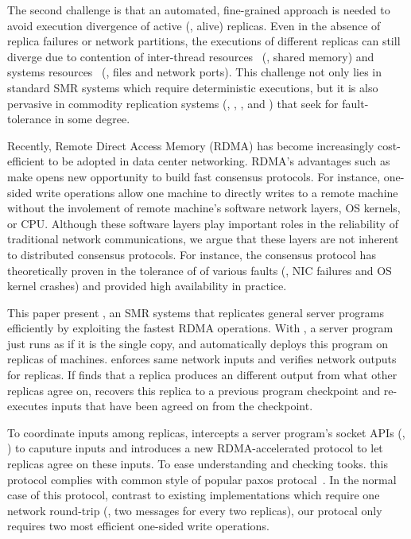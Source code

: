 The second challenge is that an automated, fine-grained approach is needed to 
avoid execution divergence of active (\ie, alive) replicas. Even in the absence 
of replica failures or network partitions, the executions of different replicas 
can still diverge due to contention of 
inter-thread resources~\cite{coredet:asplos10} (\eg, shared memory) and systems 
resources~\cite{racepro:sosp11} (\eg, files and network ports). This challenge 
not only lies in standard SMR systems which require deterministic executions, 
but it is also pervasive in commodity replication systems (\eg, \redis, 
\memcached, and \mysql) that seek for fault-tolerance in some degree.

Recently, Remote Direct Access Memory (RDMA) has become increasingly 
cost-efficient to be adopted in data center networking. RDMA's advantages such 
as make opens new opportunity to build fast consensus protocols. For 
instance, one-sided write operations allow one machine to directly writes to 
a remote machine without the involement of remote machine's software network 
layers, OS kernels, or CPU. Although these software layers play important roles 
in the reliability of traditional network communications, we argue that these 
layers are not inherent to distributed consensus protocols. For 
instance, the \paxos consensus protocol has theoretically proven in the 
tolerance of of various faults (\eg, NIC failures and OS kernel crashes) and 
provided high availability in practice.

This paper present \xxx, an SMR systems that replicates general server programs 
efficiently by exploiting the fastest RDMA operations. With \xxx, 
a server program just runs as if it is the single copy, and \xxx automatically 
deploys this program on replicas of machines. \xxx enforces same network 
inputs and verifies network outputs for replicas. If \xxx finds that a replica 
produces an different output from what other replicas agree on, \xxx recovers 
this replica to a previous program checkpoint and re-executes inputs that have 
been agreed on from the checkpoint. 



To coordinate inputs among replicas, \xxx intercepts a server program's socket 
APIs (\eg, \recv) to caputure inputs and introduces a new RDMA-accelerated 
\paxos protocol to let replicas agree on these inputs. To ease understanding 
and checking tooks. this protocol complies with common style of popular paxos 
protocal~\cite{paxos:practical}. In the normal case of this protocol, contrast 
to existing implementations which require one network round-trip (\ie, two 
messages for every two replicas), our protocal only requires two most efficient 
one-sided write operations.

